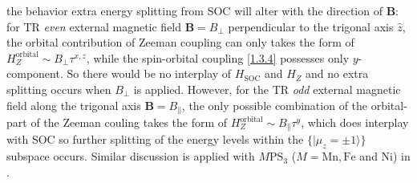 \documentclass[10pt,nofootinbib,letterpaper]{revtex4}
\begin{document}
		the behavior extra energy splitting from SOC will alter with the direction of $\bm{B}$: for TR \emph{even} external magnetic field $\bm{B}=B_\perp$ perpendicular to the trigonal axis $\hat{z}$, the orbital contribution of Zeeman coupling can only takes the form of $H_Z^{\text{orbital}}\sim B_\perp\tau^{x,z}$, while the spin-orbital coupling \eqref{1.3.4} possesses only $y$-component. So there would be no interplay of $H_{\text{SOC}}$ and $H_Z$ and no extra splitting occurs when $B_\perp$ is applied. However, for the TR \emph{odd} external magnetic field along the trigonal axis $\bm{B}=B_\parallel$, the only possible combination of the orbital-part of the Zeeman couling takes the form of $H_Z^{\text{orbital}}\sim B_\parallel\tau^y$, which does interplay with SOC so further splitting of the energy levels within the $\{|\mu_z=\pm1\rangle\}$ subspace occurs. Similar discussion is applied with $M\mathrm{PS}_3$ ($M=\mathrm{Mn, Fe}$ and $\mathrm{Ni}$) in \cite{joy1992magnetism}.
\end{document}
